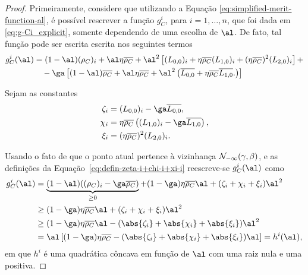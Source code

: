 \begin{proof}
 Primeiramente, considere que  utilizando a Equação \eqref{eq:simplified-merit-function-al}, é possível rescrever a função $g_C^i $, para $i=1,\ldots,n$, que foi dada em \eqref{eq:g-Ci_explicit}, somente dependendo de uma escolha de $\al$. De fato, tal função pode ser escrita escrita nos seguintes termos
\[
\begin{aligned}
{g}_C^i (\al)				& = (1-\al)(\rho_C)_i+ \al\eta\dbvec{\rho_C}+ \al^2\left[(L_{0,0})_i + \eta\dbvec{\rho_C} ({L_{1,0}})_i 
				+ (\eta\dbvec{\rho_C})^2(L_{2,0})_i \right]  + \\
				& \quad -\ga\left[  (1-\al)\dbvec{\rho_C} + \al\eta\dbvec{\rho_C} + \al^2\left(\dbvec{L_{0,0}} + \eta\dbvec{\rho_C} \dbvec{L_{1,0}}.
\right)  \right]
\end{aligned}
\]

Sejam as constantes
\begin{equation}
\label{eq:defin-zeta-i+chi-i+xi-i}
	\begin{aligned}
\zeta_i & = (L_{0,0})_i - \ga \dbvec{L_{0,0}}, \\
\chi_i  & = \eta\dbvec{\rho_C} \left( ({L_{1,0}})_i - \ga\dbvec{L_{1,0}} \right),   \\
\xi_i	& =  (\eta\dbvec{\rho_C})^2(L_{2,0})_i . \\ 	
\end{aligned}
\end{equation}



Usando o fato de que o ponto atual pertence à vizinhança $\mathcal{N}_{-\infty}(\gamma,\beta)$, e as definições da Equação~\eqref{eq:defin-zeta-i+chi-i+xi-i} reescreve-se  $g_C^i(\al) $ como
\[
\begin{aligned}
	g_C^i (\al) & = \underbrace{(1-\al)((\rho_C)_i - \ga\dbvec{\rho_C})}_{\geq 0}  + (1-\ga)\eta\dbvec{\rho_C} \al+  (\zeta_i + 				\chi_i + \xi_i)\al^2  \\
				& \geq (1-\ga)\eta\dbvec{\rho_C} \al +  (\zeta_i + 				\chi_i + \xi_i)\al^2 \\ 
				& \geq (1-\ga)\eta\dbvec{\rho_C} \al -  (\abs{\zeta_i} + \abs{\chi_i} + \abs{\xi_i})\al^2 \\
				& = \al \left[	(1-\ga)\eta\dbvec{\rho_C}  -  (\abs{\zeta_i} + \abs{\chi_i} + \abs{\xi_i})\al	\right] = h^i(\al),
\end{aligned}
\]
em que $h^i$ é uma quadrática côncava em função de $\al$ com uma raiz nula e uma positiva. 


\end{proof}
